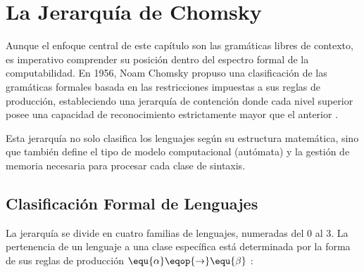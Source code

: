 \section{La Jerarquía de Chomsky}
\label{sec:3_2_jerarquia_chomsky}

Aunque el enfoque central de este capítulo son las gramáticas libres de contexto, es imperativo comprender su posición dentro del espectro formal de la computabilidad. En 1956, Noam Chomsky propuso una clasificación de las gramáticas formales basada en las restricciones impuestas a sus reglas de producción, estableciendo una jerarquía de contención donde cada nivel superior posee una capacidad de reconocimiento estrictamente mayor que el anterior \cite{sipser2012introduction, aho2006compilers}.

Esta jerarquía no solo clasifica los lenguajes según su estructura matemática, sino que también define el tipo de modelo computacional (autómata) y la gestión de memoria necesaria para procesar cada clase de sintaxis.

\subsection{Clasificación Formal de Lenguajes}
\label{subsec:3_2_1_clasificacion}

La jerarquía se divide en cuatro familias de lenguajes, numeradas del 0 al 3. La pertenencia de un lenguaje a una clase específica está determinada por la forma de sus reglas de producción $\equ{\alpha} \eqop{\rightarrow} \equ{\beta}$ \cite{sipser2012introduction}:

